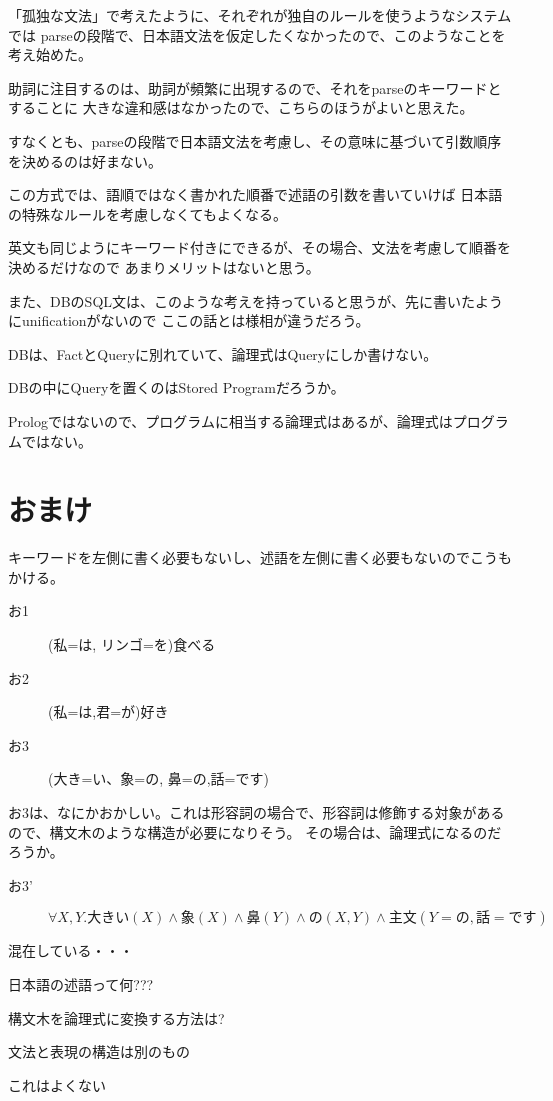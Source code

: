 \documentclass[10pt, oneside]{jarticle}   	%
\begin{document}
「孤独な文法」で考えたように、それぞれが独自のルールを使うようなシステムでは
parseの段階で、日本語文法を仮定したくなかったので、このようなことを考え始めた。

助詞に注目するのは、助詞が頻繁に出現するので、それをparseのキーワードとすることに
大きな違和感はなかったので、こちらのほうがよいと思えた。

すなくとも、parseの段階で日本語文法を考慮し、その意味に基づいて引数順序を決めるのは好まない。

この方式では、語順ではなく書かれた順番で述語の引数を書いていけば
日本語の特殊なルールを考慮しなくてもよくなる。

英文も同じようにキーワード付きにできるが、その場合、文法を考慮して順番を決めるだけなので
あまりメリットはないと思う。

また、DBのSQL文は、このような考えを持っていると思うが、先に書いたようにunificationがないので
ここの話とは様相が違うだろう。

DBは、FactとQueryに別れていて、論理式はQueryにしか書けない。

DBの中にQueryを置くのはStored Programだろうか。

Prologではないので、プログラムに相当する論理式はあるが、論理式はプログラムではない。


\section{おまけ}
キーワードを左側に書く必要もないし、述語を左側に書く必要もないのでこうもかける。

\begin{description}
\item[お1] (私=は, リンゴ=を)食べる
\item[お2] (私=は,君=が)好き
\item[お3] (大き=い、象=の, 鼻=の,話=です)
\end{description}
お3は、なにかおかしい。これは形容詞の場合で、形容詞は修飾する対象があるので、構文木のような構造が必要になりそう。
その場合は、論理式になるのだろうか。

\begin{description}
\item[お3'] $\forall X,Y . 大きい(X) \land 象(X)  \land 鼻(Y) \land の(X, Y)\land 主文(Y=の,話=です)$
\end{description}

混在している・・・

日本語の述語って何???

構文木を論理式に変換する方法は?

文法と表現の構造は別のもの

これはよくない
\end{document}

